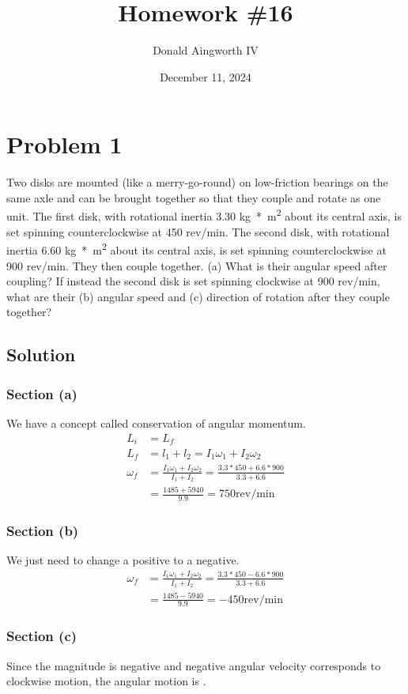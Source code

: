 \documentclass[12pt]{article}
\title{Homework \#16}
\author{Donald Aingworth IV}
\date{December 11, 2024}
\begin{document}

\maketitle

\pagebreak
\section{Problem 1}
Two disks are mounted (like a merry-go-round) on low-friction bearings on the same axle and can be brought together so that they couple and rotate as one unit. The first disk, with rotational inertia 3.30 \unit{\kilo\gram*\meter^2} about its central axis, is set spinning counterclockwise at 450 rev/min. The second disk, with rotational inertia 6.60 \unit{\kilo\gram*\meter^2} about its central axis, is set spinning counterclockwise at 900 rev/min. They then couple together. (a) What is their angular speed after coupling? If instead the second disk is set spinning clockwise at 900 rev/min, what are their (b) angular speed and (c) direction of rotation after they couple together?

\subsection{Solution}
\subsubsection{Section (a)}
We have a concept called conservation of angular momentum. 
\begin{align}
    L_i &=  L_f\\
    L_f &=  l_1 + l_2
        =   I_1\omega_1 + I_2\omega_2\\
    \omega_f    &=  \frac{I_1\omega_1 + I_2\omega_2}{I_1 + I_2}
        =   \frac{3.3*450 + 6.6*900}{3.3 + 6.6}\\
        &=  \frac{1485 + 5940}{9.9}
        =   \boxed{750\text{rev/min}}
\end{align}

\subsubsection{Section (b)}
We just need to change a positive to a negative. 
\begin{align}
    \omega_f    &=  \frac{I_1\omega_1 + I_2\omega_2}{I_1 + I_2}
        =   \frac{3.3*450 - 6.6*900}{3.3 + 6.6}\\
        &=  \frac{1485 - 5940}{9.9}
        =   \boxed{-450\text{rev/min}}
\end{align}

\subsubsection{Section (c)}
Since the magnitude is negative and negative angular velocity corresponds to clockwise motion, the angular motion is .
\end{document}
